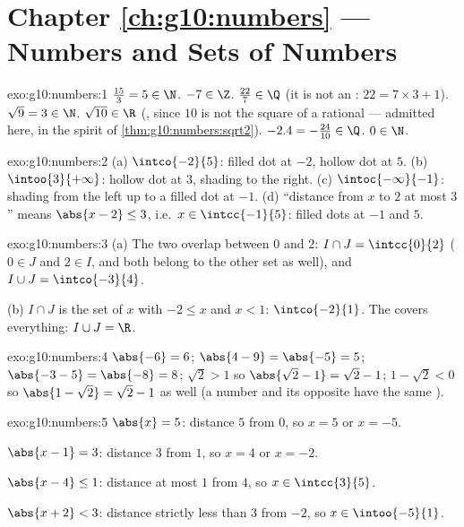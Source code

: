 \section*{Chapter \ref{ch:g10:numbers} --- Numbers and Sets of Numbers}

\begin{solution}{exo:g10:numbers:1}
$\frac{15}{3} = 5 \in \N$. \quad $-7 \in \Z$. \quad
$\frac{22}{7} \in \Q$ (it is not an : $22 = 7 \times 3 + 1$).
\quad $\sqrt 9 = 3 \in \N$. \quad $\sqrt{10} \in \R$ (, since
$10$ is not the square of a rational --- admitted here, in the spirit of
\cref{thm:g10:numbers:sqrt2}). \quad $-2.4 = -\frac{24}{10} \in \Q$.
\quad $0 \in \N$.
\end{solution}

\begin{solution}{exo:g10:numbers:2}
(a) $\intco{-2}{5}$: filled dot at $-2$, hollow dot at $5$.
(b) $\intoo{3}{+\infty}$: hollow dot at $3$, shading to the right.
(c) $\intoc{-\infty}{-1}$: shading from the left up to a filled dot at
$-1$.
(d) ``distance from $x$ to $2$ at most $3$'' means $\abs{x - 2} \leq 3$,
i.e.\ $x \in \intcc{-1}{5}$: filled dots at $-1$ and $5$.
\end{solution}

\begin{solution}{exo:g10:numbers:3}
(a) The two  overlap between $0$ and $2$:
$I \cap J = \intcc{0}{2}$ ($0 \in J$ and $2 \in I$, and both belong to the
other set as well), and $I \cup J = \intco{-3}{4}$.

(b) $I \cap J$ is the set of $x$ with $-2 \leq x$ and $x < 1$:
$\intco{-2}{1}$. The  covers everything: $I \cup J = \R$.
\end{solution}

\begin{solution}{exo:g10:numbers:4}
$\abs{-6} = 6$; \quad $\abs{4 - 9} = \abs{-5} = 5$; \quad
$\abs{-3 - 5} = \abs{-8} = 8$; \quad
$\sqrt 2 > 1$ so $\abs{\sqrt2 - 1} = \sqrt2 - 1$; \quad
$1 - \sqrt2 < 0$ so $\abs{1 - \sqrt2} = \sqrt2 - 1$ as well (a number and
its opposite have the same ).
\end{solution}

\begin{solution}{exo:g10:numbers:5}
$\abs{x} = 5$: distance $5$ from $0$, so $x = 5$ or $x = -5$.

$\abs{x - 1} = 3$: distance $3$ from $1$, so $x = 4$ or $x = -2$.

$\abs{x - 4} \leq 1$: distance at most $1$ from $4$, so
$x \in \intcc{3}{5}$.

$\abs{x + 2} < 3$: distance strictly less than $3$ from $-2$, so
$x \in \intoo{-5}{1}$.
\end{solution}

